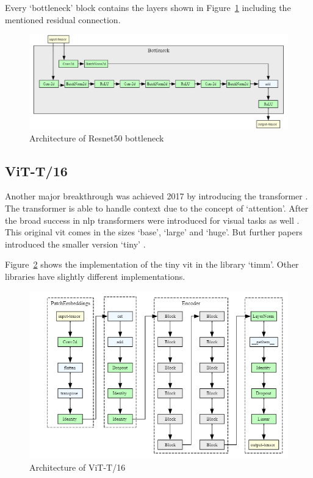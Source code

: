 Every `bottleneck' block contains the layers shown in Figure~\ref{fig:resnet50_architecture_bottleneck} including the mentioned residual connection.

\begin{figure}[H]
    \begin{center}
    \includegraphics[width=15cm]{../images/resnet50_architecture_bottleneck.png}
    \caption{Architecture of Resnet50 bottleneck}\label{fig:resnet50_architecture_bottleneck}
    \end{center}
\end{figure}

\subsection{ViT-T/16}
Another major breakthrough was achieved 2017 by introducing the transformer \autocite{vaswani2017}. The transformer is able to handle context due to the concept of `attention'. After the broad success in \gls{nlp} transformers were introduced for visual tasks as well \autocite{dosovitskiy2020}. This original \gls{vit} comes in the sizes `base', `large' and `huge'. But further papers introduced the smaller version `tiny' \autocite{liu2021,wu2022}.

Figure~\ref{fig:vit_t16_architecture} shows the implementation of the tiny \gls{vit} in the library `timm'. Other libraries have slightly different implementations.

\begin{figure}[H]
    \begin{center}
    \includegraphics[width=15cm]{../images/vit_t16_architecture.png}
    \caption{Architecture of ViT-T/16}\label{fig:vit_t16_architecture}
    \end{center}
\end{figure}

